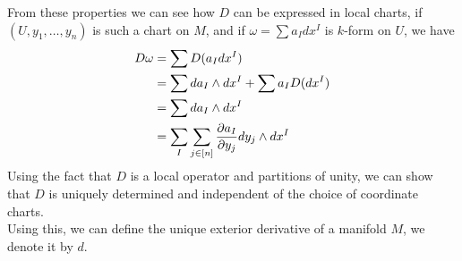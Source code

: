 \documentclass[../main.tex]{subfiles}
\begin{document}
From these properties we can see how $D$ can be expressed in local charts, if $( U, y_1,\ldots, y_n) $ is such a chart on $M$, and if $\omega = \sum a_I dx^{I}$ is $k$-form on $U$, we have
\begin{align*}
	D\omega &= \sum D( a_I dx^{I}) \\
	&= \sum d a_I\wedge dx^{I} + \sum a_I D ( dx^{I}) \\
	&= \sum d a_I \wedge dx^{I} \\
	&= \sum_I \sum_{j \in [ n] } \frac{\partial a_I}{\partial y_j} dy_j \wedge dx^{I}
\end{align*}
Using the fact that $D$ is a local operator and partitions of unity, we can show that $D$ is uniquely  determined and independent of the choice of coordinate charts.\\
Using this, we can define the unique exterior derivative of a manifold $M$, we denote it by $d$.
\end{document}
